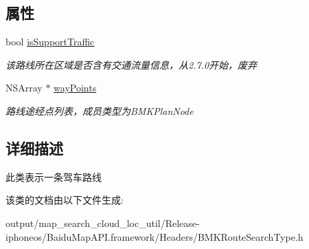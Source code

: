 \subsection*{属性}
\begin{DoxyCompactItemize}
\item 
\hypertarget{interface_b_m_k_driving_route_line_a23c30bf764fd27531e7f7d1e1cb1d6b4}{}bool \hyperlink{interface_b_m_k_driving_route_line_a23c30bf764fd27531e7f7d1e1cb1d6b4}{is\+Support\+Traffic}\label{interface_b_m_k_driving_route_line_a23c30bf764fd27531e7f7d1e1cb1d6b4}

\begin{DoxyCompactList}\small\item\em 该路线所在区域是否含有交通流量信息，从2.7.\+0开始，废弃 \end{DoxyCompactList}\item 
\hypertarget{interface_b_m_k_driving_route_line_a577c5a10368ef9c18ac73f20836092bd}{}N\+S\+Array $\ast$ \hyperlink{interface_b_m_k_driving_route_line_a577c5a10368ef9c18ac73f20836092bd}{way\+Points}\label{interface_b_m_k_driving_route_line_a577c5a10368ef9c18ac73f20836092bd}

\begin{DoxyCompactList}\small\item\em 路线途经点列表，成员类型为\+B\+M\+K\+Plan\+Node \end{DoxyCompactList}\end{DoxyCompactItemize}


\subsection{详细描述}
此类表示一条驾车路线 

该类的文档由以下文件生成\+:\begin{DoxyCompactItemize}
\item 
output/map\+\_\+search\+\_\+cloud\+\_\+loc\+\_\+util/\+Release-\/iphoneos/\+Baidu\+Map\+A\+P\+I.\+framework/\+Headers/B\+M\+K\+Route\+Search\+Type.\+h\end{DoxyCompactItemize}
